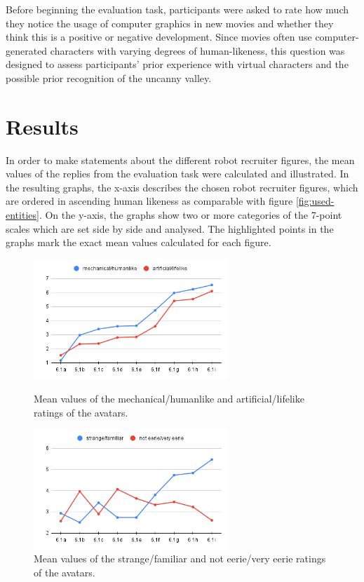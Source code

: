 Before beginning the evaluation task, participants were asked to rate how much they notice the usage of computer graphics in new movies and whether they think this is a positive or negative development. Since movies often use computer-generated characters with varying degrees of human-likeness, this question was designed to assess participants' prior experience with virtual characters and the possible prior recognition of the uncanny valley.


\section{Results}
In order to make statements about the different robot recruiter figures, the mean values of the replies from the evaluation task were calculated and illustrated. In the resulting graphs, the x-axis describes the chosen robot recruiter figures, which are ordered in ascending human likeness as comparable with figure \ref{fig:used-entities}. On the y-axis, the graphs show two or more categories of the 7-point scales which are set side by side and analysed. The highlighted points in the graphs mark the exact mean values calculated for each figure.\par
\begin{figure} %
    \centering
    \includegraphics[width=0.65\textwidth]{graphics/result/result1.png}
    \caption{Mean values of the mechanical/humanlike and artificial/lifelike ratings of the avatars.}
    \label{fig:humanlikeness}
    \vspace{20pt}
    \centering
    \includegraphics[width=0.65\textwidth]{graphics/result/result2.png}
    \caption{Mean values of the strange/familiar and not eerie/very eerie ratings of the avatars.}
    \label{fig:strangeness}
\end{figure}
